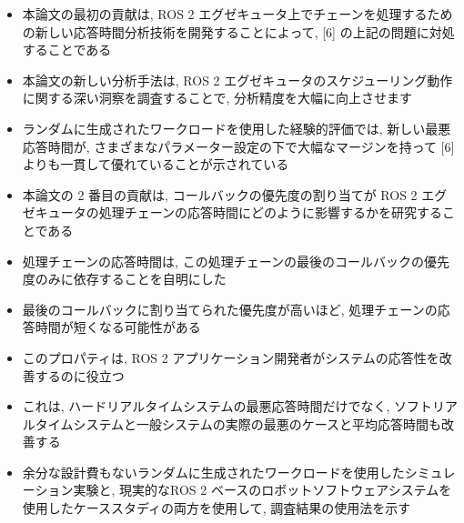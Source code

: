 \begin{frame}{}
    \begin{itemize}
        \item 本論文の最初の貢献は, ROS 2 エグゼキュータ上でチェーンを処理するための新しい応答時間分析技術を開発することによって, [6] の上記の問題に対処することである
        \item 本論文の新しい分析手法は, ROS 2 エグゼキュータのスケジューリング動作に関する深い洞察を調査することで, 分析精度を大幅に向上させます
        \item ランダムに生成されたワークロードを使用した経験的評価では, 新しい最悪応答時間が, さまざまなパラメーター設定の下で大幅なマージンを持って [6] よりも一貫して優れていることが示されている
    \end{itemize}
\end{frame}

\begin{frame}{}
    \begin{itemize}
        \item 本論文の 2 番目の貢献は, コールバックの優先度の割り当てが ROS 2 エグゼキュータの処理チェーンの応答時間にどのように影響するかを研究することである
        \item 処理チェーンの応答時間は, この処理チェーンの最後のコールバックの優先度のみに依存することを自明にした
        \item 最後のコールバックに割り当てられた優先度が高いほど, 処理チェーンの応答時間が短くなる可能性がある
        \item このプロパティは, ROS 2 アプリケーション開発者がシステムの応答性を改善するのに役立つ
        \item これは, ハードリアルタイムシステムの最悪応答時間だけでなく, ソフトリアルタイムシステムと一般システムの実際の最悪のケースと平均応答時間も改善する
        \item 余分な設計費もないランダムに生成されたワークロードを使用したシミュレーション実験と, 現実的なROS 2 ベースのロボットソフトウェアシステムを使用したケーススタディの両方を使用して, 調査結果の使用法を示す
    \end{itemize}
\end{frame}
